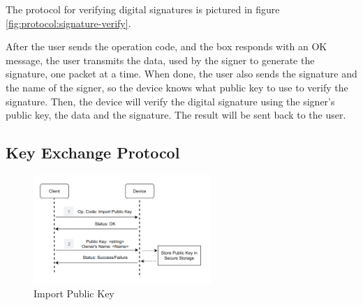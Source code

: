 The protocol for verifying digital signatures is pictured in figure \ref{fig:protocol:signature-verify}.

After the user sends the operation code, and the box responds with an OK message, the user transmits the data, used by the signer to generate the signature, one packet at a time.
When done, the user also sends the signature and the name of the signer, so the device knows what public key to use to verify the signature.
Then, the device will verify the digital signature using the signer's public key, the data and the signature. The result will be sent back to the user.

\subsection{Key Exchange Protocol} \label{chap:solution:protocol:key}

\begin{figure}[h]
	\centering
	\includegraphics[width=0.6\textwidth]{./Images/import-pub-key.png}
	\caption{Import Public Key}
	\label{fig:protocol:import-pub}
\end{figure}

